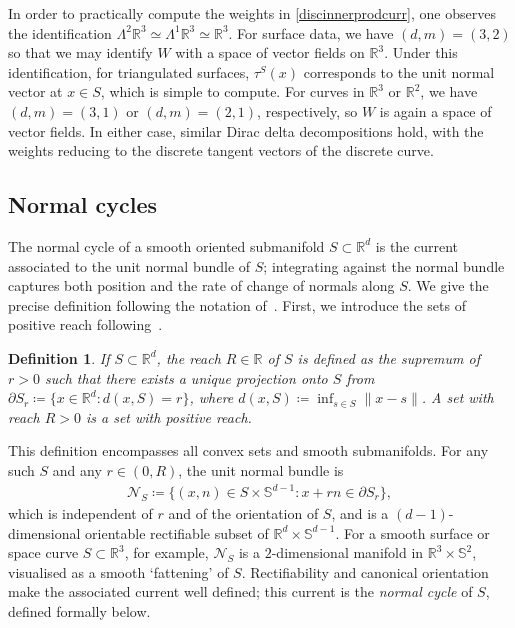 \documentclass[sn-mathphys-num]{sn-jnl}%
\theoremstyle{thmstyleone}%
\theoremstyle{thmstyletwo}%
\theoremstyle{thmstylethree}%
\newtheorem{definition}{Definition}%
\numberwithin{remark}{section}
\numberwithin{definition}{section}
\numberwithin{equation}{section}
\numberwithin{theorem}{section}
\newcommand{\R}{\ensuremath{\mathbb{R}}}%
\newcommand{\tit}[1]{\textit{#1}}
\begin{document}
In order to practically compute the weights in \cref{discinnerprodcurr}, one observes \cite{FidelityMetrics} the identification $\Lambda^{2}\R^{3} \simeq \Lambda^{1}\R^{3} \simeq \R^{3}$. For surface data, we have $(d,m)=(3,2)$ so that we may identify $W$ with a space of vector fields on $\R^{3}$. Under this identification, for triangulated surfaces, $\tau^{S}(x)$ corresponds to the unit normal vector at $x \in S$, which is simple to compute. For curves in $\R^{3}$ or $\R^{2}$, we have $(d,m)=(3,1)$ or $(d,m)=(2,1)$, respectively, so $W$ is again a space of vector fields. In either case, similar Dirac delta decompositions hold, with the weights reducing to the discrete tangent vectors of the discrete curve. 

\subsection{Normal cycles}
The normal cycle of a smooth oriented submanifold $S\subset \R^{d}$ is the current associated to the unit normal bundle of $S$; integrating against the normal bundle captures both position and the rate of change of normals along $S$. We give the precise definition following the notation of~\cite{NCpaper}.
First, we introduce the sets of positive reach following~\cite{Federer1959}.
\begin{definition}
    If $S\subset \R^{d}$, the reach $R \in \R$ of $S$ is defined as the supremum of $r>0$ such that there exists a unique projection onto $S$ from $\partial S_{r}\coloneq\{x \in \R^{d}: d(x,S)=r\}$, where $d(x,S) \coloneq \inf_{s\in S}\|x-s\|$. A set with reach $R>0$ is a set with positive reach.
\end{definition}
This definition encompasses all convex sets and smooth submanifolds. For any such $S$ and any $r\in(0,R)$, the unit normal bundle is
\begin{align}\label{unitnormalbunfle}
    \mathcal{N}_{S} \coloneq \{(x,n) \in S \times \mathbb{S}^{d-1}: x+rn \in \partial S_{r} \},
\end{align}
which is independent of $r$ and of the orientation of $S$, and is a $(d-1)$-dimensional orientable rectifiable subset of $\R^{d}\times \mathbb{S}^{d-1}$. For a smooth surface or space curve $S\subset \R^{3}$, for example, $\mathcal{N}_{S}$ is a $2$-dimensional manifold in $\R^{3}\times \mathbb{S}^{2}$, visualised as a smooth `fattening' of $S$. Rectifiability and canonical orientation make the associated current well defined; this current is the \tit{normal cycle} of $S$, defined formally below.
\end{document}
